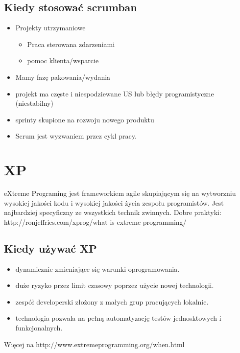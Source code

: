 \documentclass[epic,eepic,aspectratio=169,12pt]{article}
\begin{document}
\subsection{Kiedy stosować scrumban}
\begin{itemize}
	\item Projekty utrzymaniowe
	\begin{itemize}
		\item Praca sterowana zdarzeniami
		\item pomoc klienta/wsparcie
	\end{itemize}
	\item Mamy fazę pakowania/wydania
	\item projekt ma częste i niespodziewane US lub błędy programistyczne (niestabilny)
	\item sprinty skupione na rozwoju nowego produktu
	\item Scrum jest wyzwaniem przez cykl pracy.
\end{itemize}
\section{XP}
eXtreme Programing jest frameworkiem agile skupiającym się na wytworzniu wysokiej jakości kodu i wysokiej jakości życia zespołu programistów. Jest najbardziej specyficzny ze wszystkich technik zwinnych.
Dobre praktyki: http://ronjeffries.com/xprog/what-is-extreme-programming/
\subsection{Kiedy używać XP}

\begin{itemize}
	\item dynamicznie zmieniające się warunki oprogramowania.
	\item duże ryzyko przez limit czasowy poprzez użycie nowej technologii.
	\item zespół developerski złożony z małych grup pracujących lokalnie.
	\item technologia pozwala na pełną automatyzację testów jednosktowych i funkcjonalnych.
\end{itemize}
Więcej na http://www.extremeprogramming.org/when.html
\end{document}
